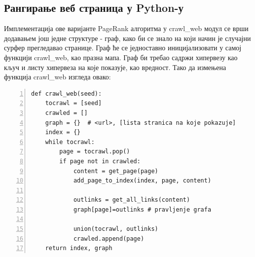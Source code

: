 		\subsection{Рангирање веб страница у Python-у}
		Имплементација ове варијанте PageRank алгоритма у crawl\_web модул се врши додавањем још једне структуре - граф, како би се знало на који начин је случајни сурфер прегледавао странице. Граф ће се једноставно иницијализовати у самој функцији crawl\_web, као празна мапа. Граф би требао садржи хипервезу као кључ и листу хипервеза на које показује, као вредност. Тако да измењена функција crawl\_web изгледа овако:
		\begin{lstlisting}[caption=Увођење графа у crawl\_web, label={lst:graph}, numbers=left]
def crawl_web(seed):
    tocrawl = [seed]
    crawled = []
    graph = {}  # <url>, [lista stranica na koje pokazuje]
    index = {} 
    while tocrawl: 
        page = tocrawl.pop()
        if page not in crawled:
            content = get_page(page)
            add_page_to_index(index, page, content)
            
            outlinks = get_all_links(content)
            graph[page]=outlinks # pravljenje grafa
            
            union(tocrawl, outlinks)
            crawled.append(page)
    return index, graph
		\end{lstlisting}
